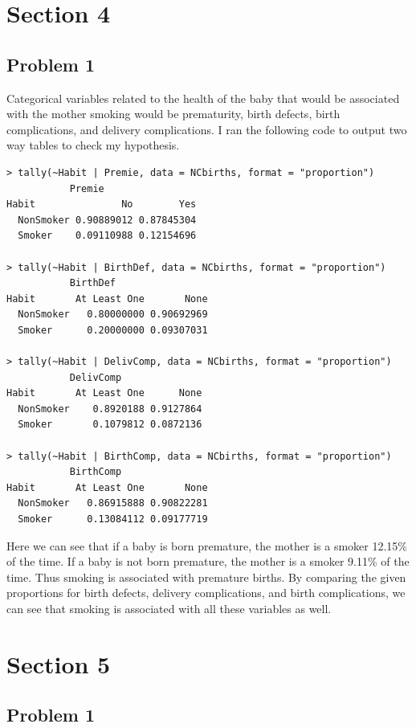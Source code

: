 \documentclass[12pt]{article}
\begin{document}
\section*{Section 4}

\subsection*{Problem 1}

Categorical variables related to the health of the baby that would be associated with the mother smoking would be prematurity,
birth defects, birth complications, and delivery complications. I ran the following code to output two way tables
to check my hypothesis.
\scriptsize
\begin{verbatim}
> tally(~Habit | Premie, data = NCbirths, format = "proportion")
           Premie
Habit               No        Yes
  NonSmoker 0.90889012 0.87845304
  Smoker    0.09110988 0.12154696

> tally(~Habit | BirthDef, data = NCbirths, format = "proportion")
           BirthDef
Habit       At Least One       None
  NonSmoker   0.80000000 0.90692969
  Smoker      0.20000000 0.09307031

> tally(~Habit | DelivComp, data = NCbirths, format = "proportion")
           DelivComp
Habit       At Least One      None
  NonSmoker    0.8920188 0.9127864
  Smoker       0.1079812 0.0872136

> tally(~Habit | BirthComp, data = NCbirths, format = "proportion")
           BirthComp
Habit       At Least One       None
  NonSmoker   0.86915888 0.90822281
  Smoker      0.13084112 0.09177719
\end{verbatim}
\normalsize
Here we can see that if a baby is born premature, the mother is a smoker 12.15\% of the time. If a baby is not born premature,
the mother is a smoker 9.11\% of the time. Thus smoking is associated with premature births. By comparing the given proportions
for birth defects, delivery complications, and birth complications, we can see that smoking is associated with all these variables
as well.

\section*{Section 5}

\subsection*{Problem 1}
\end{document}
